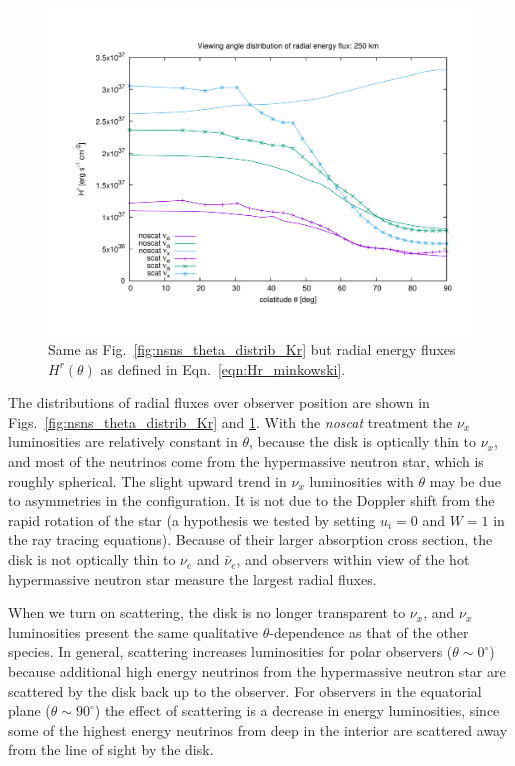 \documentclass[aps,floatfix,prd,superscriptaddress,twocolumn]{revtex4-1}
\begin{document}
\begin{figure}
  \includegraphics[width=\columnwidth]{theta_distrib-250km-Hr}
  \caption{Same as Fig.~\ref{fig:nsns_theta_distrib_Kr} but radial energy
    fluxes $H^r(\theta)$ as defined in Eqn.~\ref{eqn:Hr_minkowski}.
  }
  \label{fig:nsns_theta_distrib_Hr}
\end{figure}

The distributions of radial fluxes over observer position are shown
in Figs.~\ref{fig:nsns_theta_distrib_Kr} and \ref{fig:nsns_theta_distrib_Hr}.
With the \emph{noscat} treatment the $\nu_x$ luminosities are relatively
constant in $\theta$, because the disk is optically thin to $\nu_x$,
and most of the neutrinos come from the hypermassive neutron star,
which is roughly spherical.
The slight upward trend in $\nu_x$ luminosities with $\theta$ may be due to
asymmetries in the configuration.
It is not due to the Doppler shift from the rapid rotation of the star
(a hypothesis we tested by setting $u_i=0$ and $W=1$ in the ray
tracing equations).
Because of their larger absorption cross section,
the disk is not optically thin to $\nu_e$ and $\bar{\nu}_e$,
and observers within view of the hot hypermassive neutron star measure
the largest radial fluxes.

When we turn on scattering, the disk is no longer transparent to $\nu_x$,
and $\nu_x$ luminosities present the same qualitative $\theta$-dependence
as that of the other species.
In general, scattering increases luminosities for polar observers
($\theta \sim 0^\circ$) because additional high energy neutrinos
from the hypermassive neutron star are scattered by the disk back up to
the observer.
For observers in the equatorial plane ($\theta \sim 90^\circ$)
the effect of scattering is a decrease in energy luminosities,
since some of the highest energy neutrinos from deep in the interior
are scattered away from the line of sight by the disk.
\end{document}
